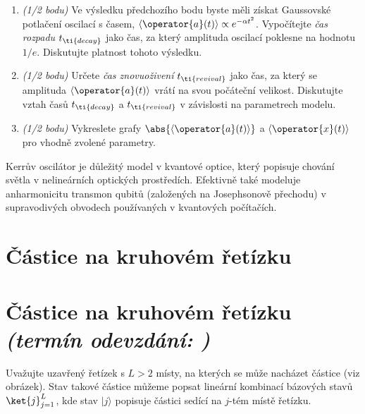 \documentclass[a4paper,11pt,twoside]{book}
\def\np{\newpage}
\newcommand{\exercise}[2][]{\ifthenelse{\isempty{#1}}
	{\np\section{#2}}
	{\np\section[#2]{{#2} \small{\it{(termín odevzdání: {#1})}}}}
}
\begin{document}
\begin{enumerate}
        \item\emph{(1/2 bodu)}
            Ve výsledku předchozího bodu byste měli získat Gaussovské potlačení oscilací s časem, $\left\langle\operator{a}(t)\right\rangle\propto e^{-\alpha t^2}$.
            Vypočítejte \emph{čas rozpadu} $t_{\ti{decay}}$ jako čas, za který amplituda oscilací poklesne na hodnotu $1/e$. 
            Diskutujte platnost tohoto výsledku.

        \item\emph{(1/2 bodu)}
            Určete \emph{čas znovuoživení} $t_{\ti{revival}}$ jako čas, za který se amplituda $\left\langle\operator{a}(t)\right\rangle$ vrátí na svou počáteční velikost.
            Diskutujte vztah časů $t_{\ti{decay}}$ a $t_{\ti{revival}}$ v závislosti na parametrech modelu.

        \item\emph{(1/2 bodu)}
            Vykreslete grafy $\abs{\left\langle\operator{a}(t)\right\rangle}$ a $\langle\operator{x}(t)\rangle$ pro vhodně zvolené parametry.

    \end{enumerate}

\note
    Kerrův oscilátor je důležitý model v kvantové optice, který popisuje chování světla v nelineárních optických prostředích.
    Efektivně také modeluje anharmonicitu transmon qubitů (založených na Josephsonově přechodu) v supravodivých obvodech používaných v kvantových počítačích.

\exercise{Částice na kruhovém řetízku}
Uvažujte uzavřený řetízek s $L>2$ místy, na kterých se může nacházet částice (viz obrázek).
Stav takové částice můžeme popsat lineární kombinací bázových stavů $\ket{j}_{j=1}^L$, kde stav $|j\rangle$ popisuje částici sedící na $j$-tém místě řetízku.

\begin{figure}[ht]
    \centering
{}
\end{figure}
\end{document}
